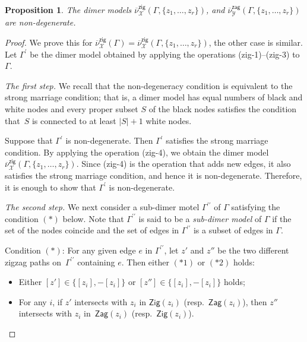 \documentclass[pdftex]{sigma}%
\numberwithin{equation}{section}
\numberwithin{figure}{section}
\numberwithin{table}{section}
\newtheorem{Proposition}[Theorem]{Proposition}
 { \theoremstyle{definition}
\newtheorem{Definition}[Theorem]{Definition}
\newtheorem{Note}[Theorem]{Note}
\newtheorem{Example}[Theorem]{Example}
\newtheorem{Remark}[Theorem]{Remark}
\newtheorem{observation}[Theorem]{Observation}
\newtheorem{operation}[Theorem]{Operation}
\newtheorem{setting}[Theorem]{Setting}}
\newcommand{\calX}{\mathcal{X}}
\newcommand{\calY}{\mathcal{Y}}
\newcommand{\Zig}{\mathsf{Zig}}
\newcommand{\Zag}{\mathsf{Zag}}
\newcommand{\zig}{\mathsf{zig}}
\newcommand{\zag}{\mathsf{zag}}
\begin{document}
\begin{Proposition}\label{prop_nondegenerate}
The dimer models $\overline{\nu}^\zig_\calX(\Gamma, \{z_1,\dots,z_r\})$, and $\overline{\nu}^\zag_\calY(\Gamma, \{z_1,\dots,z_r\})$ are non-degenerate.
\end{Proposition}

\begin{proof}
We prove this for $\overline{\nu}^\zig_\calX(\Gamma)=\overline{\nu}^\zig_\calX(\Gamma, \{z_1,\dots,z_r\})$, the other case is similar.
Let $\Gamma^\prime$ be the dimer model obtained by applying the operations (zig-1)--(zig-3) to $\Gamma$.

{\it The first step.}
We recall that the non-degeneracy condition is equivalent to the strong marriage condition; that is, a dimer model has equal numbers of black and white nodes and every proper subset $S$ of the black nodes satisfies the condition that~$S$ is connected to at least $|S|+1$ white nodes.

Suppose that $\Gamma^\prime$ is non-degenerate. Then $\Gamma^\prime$ satisfies the strong marriage condition.
By applying the operation (zig-4), we obtain the dimer model $\overline{\nu}^\zig_\calX(\Gamma, \{z_1,\dots,z_r\})$.
Since (zig-4) is the operation that adds new edges, it also satisfies the strong marriage condition, and hence it is non-degenerate.
Therefore, it is enough to show that $\Gamma^\prime$ is non-degenerate.

{\it The second step.}
We next consider a sub-dimer motel $\Gamma^{\prime \prime}$ of $\Gamma$ satisfying the condition $(*)$ below.
Note that $\Gamma^{\prime\prime}$ is said to be a \emph{sub-dimer model} of $\Gamma$
if the set of the nodes coincide and the set of edges in $\Gamma^{\prime\prime}$ is a subset of edges in $\Gamma$.

Condition $(*)$: For any given edge $e$ in $\Gamma^{\prime\prime}$,
let $z'$ and $z''$ be the two different zigzag paths on~$\Gamma^{\prime\prime}$ containing $e$.
Then either $(*1)$ or $(*2)$ holds:
\begin{itemize}
\setlength{\parskip}{0pt}
\itemsep=0pt
\setlength{\leftskip}{0.3cm}
\item[$(*1)$] Either $[z'] \in \{[z_i],-[z_i]\}$ or $[z''] \in \{[z_i],-[z_i]\}$ holds;
\item[$(*2)$] For any $i$, if $z'$ intersects with $z_i$ in $\Zig(z_i)$ (resp.~$\Zag(z_i)$), then $z''$ intersects with $z_i$ in~$\Zag(z_i)$ (resp.~$\Zig(z_i)$).
\end{itemize}


\end{proof}
\end{document}
